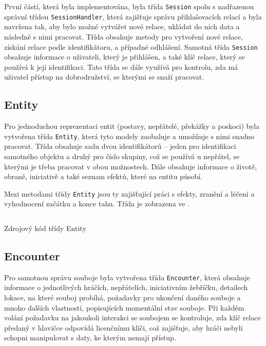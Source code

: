První částí, která byla implementována, byla třída \texttt{Session} spolu s nadřazenou správní třídou \texttt{SessionHandler}, která zajišťuje správu přihlašovacích relací a byla navržena tak, aby bylo možné vytvářet nové relace, ukládat do nich data a následně s nimi pracovat. Třída obsahuje metody pro vytvoření nové relace, získání relace podle identifikátoru, a případné odhlášení. Samotná třída \texttt{Session} obsahuje informace o uživateli, který je přihlášen, a také klíč relace, který se používá k její identifikaci. Tato třída se dále využívá pro kontrolu, zda má uživatel přístup na dobrodružství, se kterými se snaží pracovat.


\subsection{Entity}
\label{subsec:impl_entity}

Pro jednoduchou reprezentaci entit (postavy, nepřátelé, překážky a poskoci) byla vytvořena třída \texttt{Entity}, která tyto modely zaobaluje a umožňuje s nimi snadno pracovat. Třída obsahuje sadu dvou identifikátorů -- jeden pro identifikaci samotného objektu a druhý pro číslo skupiny, což se používá u nepřátel, se kterými je třeba pracovat v obou možnostech. Dále obsahuje informace o životě, obraně, iniciativě a také seznam efektů, které na entitu působí.

Mezi metodami třídy \texttt{Entity} jsou ty zajišťující práci s efekty, zranění a léčení a vyhodnocení začátku a konce tahu. Třída je zobrazena ve .

\begin{listing}[H]
    \inputminted{Java}{code/EncounterEntity.java}
    \caption{Zdrojový kód třídy Entity}
    \label{code:entity}
\end{listing}


\subsection{Encounter}
\label{subsec:impl_encounter}

Pro samotnou správu souboje byla vytvořena třída \texttt{Encounter}, která obsahuje informace o jednotlivých hráčích, nepřátelích, iniciativním žebříčku, detailech lokace, na které souboj probíhá, požadavky pro ukončení daného souboje a mnoho dalších vlastností, popisujících momentální stav souboje. Při každém volání požadavku na jakoukoli interakci se soubojem se kontroluje, zda klíč relace předaný v hlavičce odpovídá licenčnímu klíči, což zajišťuje, aby hráči nebyli schopni manipulovat s daty, ke kterým nemají přístup. 

